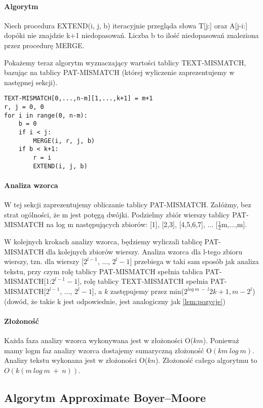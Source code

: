 \paragraph{Algorytm}
Niech procedura EXTEND(i, j, b) iteracyjnie przegląda słowa T[j:] oraz A[j-i:] dopóki nie znajdzie k+1 niedopasowań. Liczba b to ilość niedopasowań znaleziona przez procedurę MERGE.

Pokażemy teraz algorytm wyznaczający wartości tablicy TEXT-MISMATCH, bazując na tablicy PAT-MISMATCH (której wyliczenie zaprezentujemy w następnej sekcji).
\begin{verbatim}
TEXT-MISMATCH[0,...,n-m][1,...,k+1] = m+1
r, j = 0, 0
for i in range(0, n-m):
    b = 0
    if i < j:
        MERGE(i, r, j, b)
    if b < k+1:
        r = i
        EXTEND(i, j, b)
\end{verbatim}
\paragraph{Analiza wzorca}
W tej sekcji zaprezentujemy obliczanie tablicy PAT-MISMATCH. 
Załóżmy, bez strat ogólności, że m jest potęgą dwójki. 
Podzielmy zbiór wierszy tablicy PAT-MISMATCH na log m następujących zbiorów: [1], [2,3], [4,5,6,7], ... [$\frac{1}{2}$m,...,m].

W kolejnych krokach analizy wzorca, będziemy wyliczali tablicę PAT-MISMATCH dla kolejnych zbiorów wierszy.
Analiza wzorca dla l-tego zbioru wierszy, tzn. dla wierszy [$2^{l-1}$, ..., $2^l-1$] przebiega w taki sam sposób jak analiza tekstu, przy czym rolę tablicy PAT-MISMATCH spełnia tablica PAT-MISMATCH[1:$2^{l-1}-1$], rolę tablicy TEXT-MISMATCH spełnia PAT-MISMATCH[$2^{l-1}$, ..., $2^l-1$], a $k$ zastępujemy przez min($2^{log\ m\ -\ l}2k+1, m-2^l$) (dowód, że takie k jest odpowiednie, jest analogiczny jak \ref{lem:pozycje})

\paragraph{Złożoność}
Każda faza analizy wzorca wykonywana jest w złożoności O($km$). 
Ponieważ mamy logm faz analizy wzorca dostajemy sumaryczną złożoność O$(km \ log \ m)$.
Analizy tekstu wykonana jest w złożoności O($kn$).
Złożoność całego algorytmu to $O(k(m\ log\ m \ + \ n))$.

\subsection{Algorytm Approximate Boyer--Moore}

